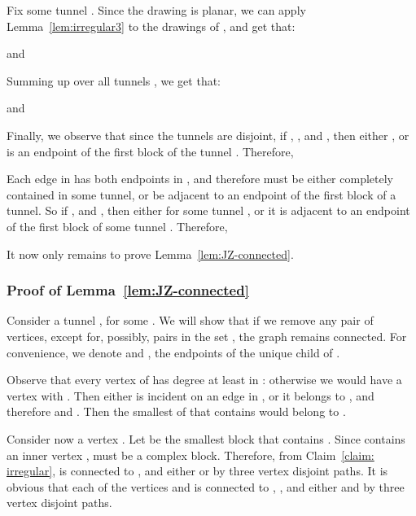 \documentclass[twoside,leqno,twocolumn]{article}
\begin{document}
\iffalse
Note that every irregular vertex in  w.r.t.~ and ,
except possibly , ,  and , is also an irregular vertex w.r.t.~ and ,
since drawings of all edges incident to it coincide in  and , and in
 and . Similarly, every irregular path (or segment of an irregular path) in   
w.r.t.~ and  is also
an irregular path w.r.t.~ and  unless it starts at , ,  or .
\fi


Fix some tunnel . Since the drawing  is planar, we can apply
Lemma~\ref{lem:irregular3} to the drawings  of , and get that:

and

Summing up over all tunnels , we get that:
\ifabstract

\fi\iffull

\fi
and


Finally, we observe that since the tunnels are disjoint, if , , and , then either , or  is an endpoint of the first block of the tunnel . Therefore,
\ifabstract

\fi\iffull

\fi
Each edge in  has both endpoints in , and therefore must be either completely contained in some tunnel, or be adjacent to an endpoint of the first block of a tunnel. So if , and , then either  for some tunnel , or it is adjacent to an endpoint of the first block of some tunnel . Therefore,
\ifabstract

\fi\iffull

\fi

\iffull
It now only remains to prove Lemma~\ref{lem:JZ-connected}.
\fi

\iffull
\subsubsection*{Proof of Lemma~\ref{lem:JZ-connected}}

Consider a tunnel ,  for some .
We will show that if we remove any pair of vertices, except for, possibly, pairs in the set
, the graph  remains connected.
For convenience, we denote  and , the endpoints of the unique child  of .

Observe that every vertex  of  has degree
at least  in : otherwise we would have a vertex  with . Then either  is incident on an edge in , or it belongs to , and therefore
and . Then the smallest  of  that contains 
would belong to . 

Consider now a vertex .  
Let  be the smallest block that contains . Since  contains an inner vertex ,  must be a complex block. Therefore,  from Claim~\ref{claim: irregular},  is connected to ,  and either 
or  by three vertex disjoint paths. It is obvious that each of the 
vertices  and  is connected to , , and
either  and  by three vertex disjoint paths. 
\end{document}
